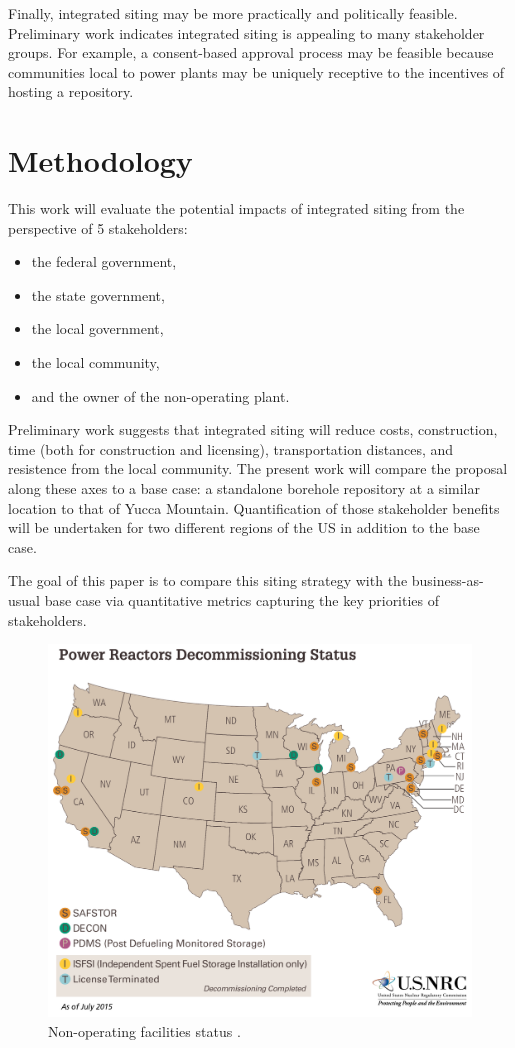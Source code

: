 Finally, integrated siting may be more practically and politically feasible. 
Preliminary work \cite{waleed_regional_2015} indicates integrated siting is 
appealing to many stakeholder groups. For example, a consent-based approval 
process may be feasible because communities local to power plants may be 
uniquely receptive to the incentives of hosting a repository.  


\section{Methodology}

This work will evaluate the potential impacts of integrated siting from the 
perspective of 5 stakeholders:
\begin{itemize}
        \item the federal government,
        \item the state government,
        \item the local government,
        \item the local community,
        \item and the owner of the non-operating plant.
\end{itemize}


Preliminary work \cite{waleed_regional_2015} suggests that integrated siting 
will reduce costs, construction, time (both for construction and licensing), 
transportation distances, and resistence from the local community.  The present 
work will compare the proposal along these axes to a base case: a standalone 
borehole repository at a similar location to that of Yucca Mountain.  
Quantification of those stakeholder benefits will be undertaken for two 
different regions of the US in addition to the base case.  

The goal of this paper is to compare this siting strategy with the 
business-as-usual base case via quantitative metrics capturing the key 
priorities of stakeholders. 

\begin{figure}[!h] 
  \centering
  \includegraphics[width=0.8\columnwidth]{power-reactors-decommissioning}	
  \caption{Non-operating facilities status
  \cite{nuclear_regulatory_commission_nrc_2015}.}
  \label{fig:shutdown}
\end{figure}



